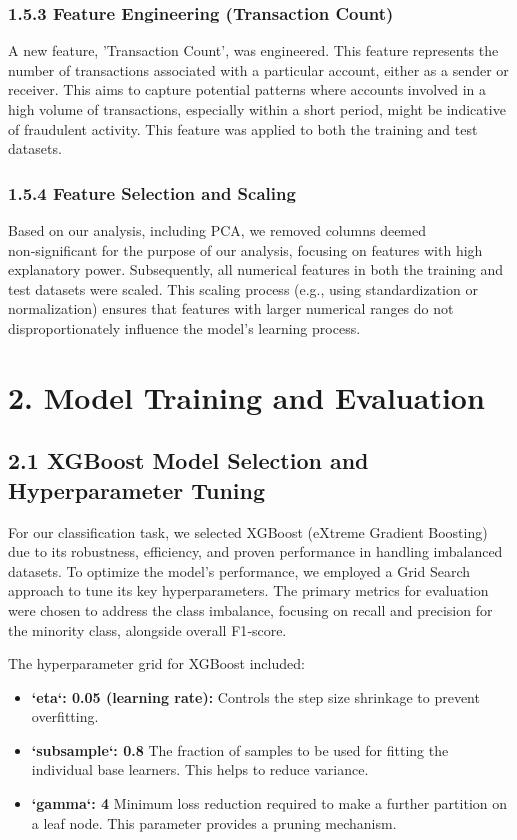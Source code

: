 \documentclass[11pt,twoside,twocolumn]{extarticle}
\begin{document}
\subsubsection*{1.5.3 Feature Engineering (Transaction Count)}
A new feature, 'Transaction Count', was engineered. This feature represents the number of transactions associated with a particular account, either as a sender or receiver. This aims to capture potential patterns where accounts involved in a high volume of transactions, especially within a short period, might be indicative of fraudulent activity. This feature was applied to both the training and test datasets.

\subsubsection*{1.5.4 Feature Selection and Scaling}
Based on our analysis, including PCA, we removed columns deemed non‑significant for the purpose of our analysis, focusing on features with high explanatory power. Subsequently, all numerical features in both the training and test datasets were scaled. This scaling process (e.g., using standardization or normalization) ensures that features with larger numerical ranges do not disproportionately influence the model's learning process.

\section*{2. Model Training and Evaluation}

\subsection*{2.1 XGBoost Model Selection and Hyperparameter Tuning}
For our classification task, we selected XGBoost (eXtreme Gradient Boosting) due to its robustness, efficiency, and proven performance in handling imbalanced datasets. To optimize the model's performance, we employed a Grid Search approach to tune its key hyperparameters. The primary metrics for evaluation were chosen to address the class imbalance, focusing on recall and precision for the minority class, alongside overall F1‑score.

The hyperparameter grid for XGBoost included:
\begin{itemize}
    \item \textbf{`eta`: 0.05 (learning rate):} Controls the step size shrinkage to prevent overfitting.
    \item \textbf{`subsample`: 0.8} The fraction of samples to be used for fitting the individual base learners. This helps to reduce variance.
    \item \textbf{`gamma`: 4} Minimum loss reduction required to make a further partition on a leaf node. This parameter provides a pruning mechanism.
\end{itemize}
\end{document}
